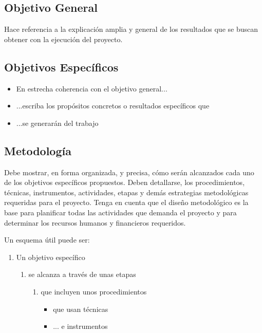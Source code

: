 \documentclass[a4paper, 11pt, oneside]{article}
\theoremstyle{definition}
\theoremstyle{remark}
\begin{document}
\subsection{Objetivo General}
Hace referencia a la explicación amplia y general de los resultados que se buscan obtener con la
ejecución del proyecto.

\subsection{Objetivos Específicos}
\begin{itemize}
\item En estrecha coherencia con el objetivo general...
\item ...escriba los propósitos concretos o resultados específicos que
\item ...se generarán del trabajo
\end{itemize}
\clearpage

\begin{center}
\section{Metodología}
\end{center}
Debe mostrar, en forma organizada, y precisa, cómo serán alcanzados cada uno de los objetivos
específicos propuestos. Deben detallarse, los procedimientos, técnicas, instrumentos, actividades,
etapas y demás estrategias metodológicas requeridas para el proyecto.  Tenga en cuenta que el
diseño metodológico es la base para planificar todas las actividades que demanda el proyecto y para
determinar los recursos humanos y financieros requeridos.

Un esquema útil puede ser:
\begin{enumerate}
  \item Un objetivo específico
  \begin{enumerate}
    \item se alcanza a través de unas etapas
    \begin{enumerate}
      \item que incluyen unos procedimientos
      \begin{itemize}
        \item que usan técnicas
        \item ... e instrumentos
      \end{itemize}
    \end{enumerate}
  \end{enumerate}
\end{enumerate}
\end{document}
